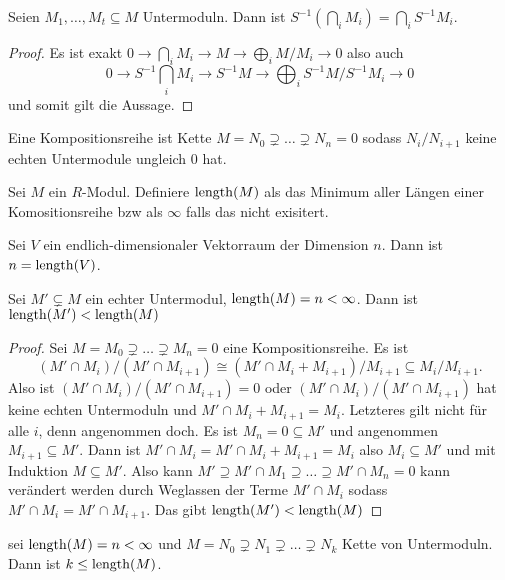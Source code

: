 \begin{Kor}
    Seien \(M_1,\dots,M_t\subseteq M\) Untermoduln. Dann ist \(S^{-1}(\bigcap_i M_i)=\bigcap_i S^{-1}M_i\).
\end{Kor}
\begin{proof}
    Es ist exakt \(0\to \bigcap_i M_i\to M\to \bigoplus_i M/M_i\to 0\) also auch 
    \[0\to S^{-1}\bigcap_i M_i\to S^{-1}M\to \bigoplus_i S^{-1}M/S^{-1}M_i\to 0\] und somit gilt die Aussage.
\end{proof}
\begin{Def}
    Eine Kompositionsreihe ist Kette \(M=N_0\supsetneq \dots \supsetneq N_n=0\) sodass \(N_i/N_{i+1}\) keine echten Untermodule ungleich \(0\) hat.
\end{Def}
\begin{Def}
    Sei \(M\) ein \(R\)-Modul. Definiere 
    \(\operatorname{length}(M)\) als das Minimum aller Längen einer Komositionsreihe bzw als \(\infty\) falls das nicht exisitert.
\end{Def}
\begin{Bsp}
    Sei \(V\) ein endlich-dimensionaler Vektorraum der Dimension \(n\). Dann ist \(n=\operatorname{length}(V)\).
\end{Bsp}
\begin{Lemma}
    Sei \(M'\subsetneq M\) ein echter Untermodul, \(\operatorname{length}(M)=n<\infty\). Dann ist \(\operatorname{length}(M')<\operatorname{length}(M)\)
\end{Lemma}
\begin{proof}
    Sei \(M=M_0\supsetneq \dots\supsetneq M_n=0\) eine Kompositionsreihe. Es ist \[(M'\cap M_i)/(M'\cap M_{i+1})\cong (M'\cap M_i+M_{i+1})/M_{i+1}\subseteq M_i/M_{i+1}.\]
    Also ist \((M'\cap M_i)/(M'\cap M_{i+1})=0\) oder \((M'\cap M_i)/(M'\cap M_{i+1})\) hat keine echten Untermoduln und \(M'\cap M_i+M_{i+1}=M_i\).
    Letzteres gilt nicht für alle \(i\), denn angenommen doch. Es ist \(M_n=0\subseteq M'\) und angenommen \(M_{i+1}\subseteq M'\). Dann ist \(M'\cap M_i=M'\cap M_i+M_{i+1}=M_i\) also \(M_i\subseteq M'\) und mit Induktion \(M\subseteq M'\).
    Also kann \(M'\supseteq M'\cap M_1\supseteq\dots \supseteq M'\cap M_n=0\) kann verändert werden durch Weglassen der Terme \(M'\cap M_i\) sodass \(M'\cap M_i=M'\cap M_{i+1}\). Das gibt \(\operatorname{length}(M')<\operatorname{length}(M)\)
\end{proof}
\begin{Lemma}
    sei \(\operatorname{length}(M)=n<\infty\) und \(M=N_0\supsetneq N_1\supsetneq\dots\supsetneq N_k\) Kette von Untermoduln. Dann ist \(k\leq \operatorname{length}(M)\). 
\end{Lemma}
